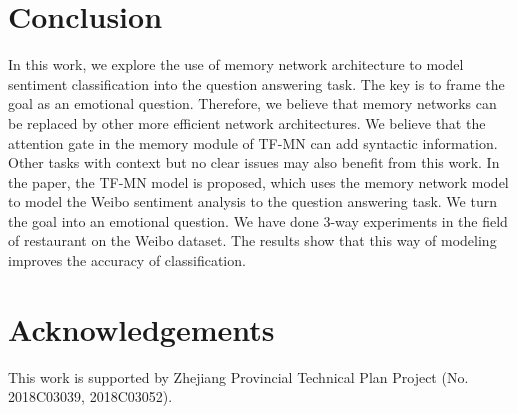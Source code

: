 \documentclass[runningheads, twocolumn]{llncs}
\begin{document}
\section{Conclusion}

In this work, we explore the use of memory network architecture to model sentiment classification into the question answering task. The key is to frame the goal as an emotional question. Therefore, we believe that memory networks can be replaced by other more efficient network architectures. We believe that the attention gate in the memory module of TF-MN can add syntactic information. Other tasks with context but no clear issues may also benefit from this work. In the paper, the TF-MN model is proposed, which uses the memory network model to model the Weibo sentiment analysis to the question answering task. We turn the goal into an emotional question. We have done 3-way experiments in the field of restaurant on the Weibo dataset. The results show that this way of modeling improves the accuracy of classification.

\section{Acknowledgements}

This work is supported by Zhejiang Provincial Technical Plan Project (No. 2018C03039, 2018C03052).



\end{document}
